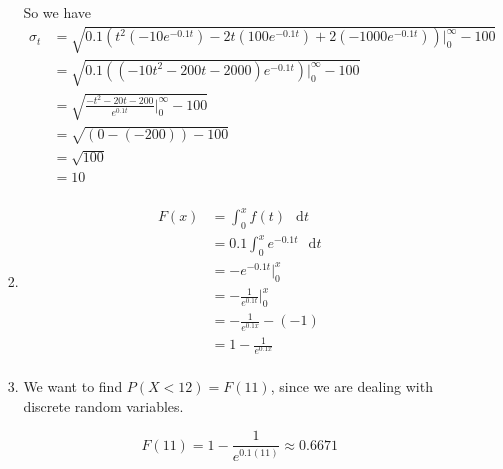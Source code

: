 \documentclass[12pt,letterpaper]{article}
\newcommand*\dif{\mathop{}\!\mathrm{d}}
\begin{document}
\begin{enumerate}
\begin{enumerate}
\begin{enumerate}[label=(\arabic*)]
              So we have
              \begin{align*}
                \sigma_t &= \sqrt{0.1 \left( t^2(-10e^{-0.1 t}) - 2t (100e^{-0.1 t}) + 2 (-1000e^{-0.1 t}) \right) \Big|_0^\infty - 100} \\
                &= \sqrt{0.1 \left( (-10t^2 - 200t - 2000) e^{-0.1 t} \right) \Big|_0^\infty - 100} \\
                &= \sqrt{\frac{-t^2 - 20t - 200}{e^{0.1 t}} \Big|_0^\infty - 100} \\
                &= \sqrt{(0 - (-200)) - 100} \\
                &= \sqrt{100} \\
                &= 10 \\
              \end{align*}
            \item
              \begin{align*}
                F(x) &= \int_0^x \! f(t) \, \dif t \\
                &= 0.1 \int_0^x \! e^{-0.1 t} \, \dif t \\
                &= - e^{-0.1 t} \Big|_0^x \\
                &= - \frac{1}{e^{0.1 t}} \Big|_0^x \\
                &= - \frac{1}{e^{0.1 x}} - (- 1) \\
                &= 1 - \frac{1}{e^{0.1 x}} \\
              \end{align*}
            \item
              We want to find $P(X < 12) = F(11)$,
              since we are dealing with discrete random variables.

              \[
                F(11) = 1 - \frac{1}{e^{0.1 (11)}} \approx 0.6671
              \]


\end{enumerate}
\end{enumerate}
\end{enumerate}
\end{document}
